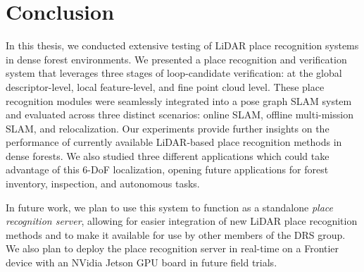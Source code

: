 \chapter{Conclusion}
\label{chap:conclusion}

In this thesis, we conducted extensive testing of LiDAR place recognition systems in dense forest environments. We presented a place recognition and verification system that leverages three stages of loop-candidate verification: at the global descriptor-level, local feature-level, and fine point cloud level. These place recognition modules were seamlessly integrated into a pose graph SLAM system and evaluated across three distinct scenarios: online SLAM, offline multi-mission SLAM, and relocalization. Our experiments provide further insights on the performance of currently available LiDAR-based place recognition methods in dense forests. We also studied three different applications which could take advantage of this 6-DoF localization, opening future applications for forest inventory, inspection, and autonomous tasks. 

In future work, we plan to use this system to function as a standalone \textit{place recognition server}, allowing for easier integration of new LiDAR place recognition methods and to make it available for use by other members of the DRS group. We also plan to deploy the place recognition server in real-time on a Frontier device with an NVidia Jetson GPU board in future field trials. 
